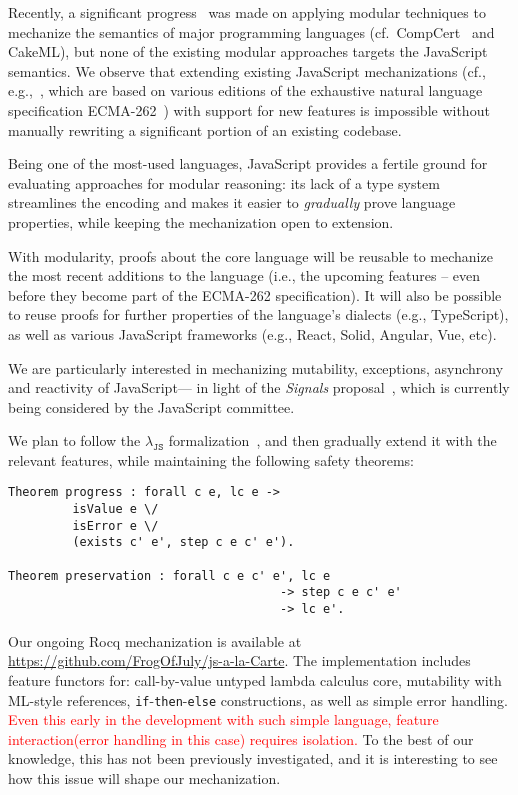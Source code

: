 \documentclass[sigplan,nonacm]{acmart}
\begin{document}
Recently, a significant progress~\cite{ebresafe2025certified} was made on applying modular techniques
to mechanize the semantics of major programming languages (cf.~CompCert~\cite{leroy2016compcert} and CakeML\cite{kumar2014cakeml}),
but none of the existing modular approaches targets the JavaScript semantics.
We observe that extending existing JavaScript mechanizations
(cf., e.g.,~\cite{guha2010essence,bodin2014trusted}, which are based on various editions of the exhaustive natural language specification ECMA-262~\cite{ECMA})
with support for new features
is impossible without manually rewriting a significant portion of an existing codebase.

Being one of the most-used languages, JavaScript provides a fertile ground for evaluating approaches for modular reasoning:
its lack of a type system streamlines the encoding and makes it easier to \emph{gradually} prove language properties,
while keeping the mechanization open to extension.


With modularity, proofs about the core language
will be reusable to mechanize the most recent additions to the language
(i.e., the upcoming features -- even before they become part of the ECMA-262 specification).
It will also be possible to reuse proofs for further properties
of the language's dialects (e.g., TypeScript),
as well as various JavaScript frameworks (e.g., React, Solid, Angular, Vue, etc).

We are particularly interested in mechanizing
mutability, exceptions, asynchrony and reactivity of JavaScript---%
in light of the \emph{Signals} proposal~\cite{signals-proposal-t39},
which is currently being considered by the JavaScript committee.

We plan to follow the $\lambda_{\texttt{JS}}$ formalization~\cite{guha2010essence},
and then gradually extend it with the relevant features,
while maintaining the following safety theorems:

\begin{lstlisting}[numbers=none, language=Coq]
Theorem progress : forall c e, lc e -> 
         isValue e \/ 
         isError e \/ 
         (exists c' e', step c e c' e').

Theorem preservation : forall c e c' e', lc e
                                      -> step c e c' e'
                                      -> lc e'.
\end{lstlisting}

Our ongoing Rocq mechanization is available at
\url{https://github.com/FrogOfJuly/js-a-la-Carte}. 
The implementation includes feature functors for: call-by-value untyped lambda calculus core, mutability with ML-style references, \texttt{if}-\texttt{then}-\texttt{else} constructions, as well as simple error handling.
\textcolor{red}{Even this early in the development with such simple language, feature interaction(error handling in this case) requires isolation.} To the best of our knowledge, this has not been previously investigated, and it is interesting to see how this issue will shape our mechanization.
\end{document}
